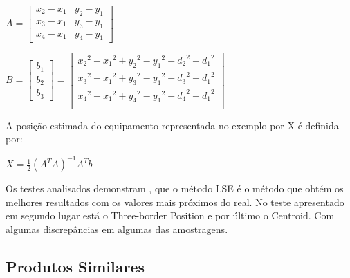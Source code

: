 \begin{center}



$A=\begin{bmatrix}
x_{2}-x_{1} & y_{2}-y_{1}\\
x_{3}-x_{1} & y_{3}-y_{1}\\
x_{4}-x_{1} & y_{4}-y_{1}
\end{bmatrix}$

$B=\begin{bmatrix}
b_{1}\\
b_{2}\\
b_{3}
\end{bmatrix}=\begin{bmatrix}
{x_{2}}^2-{x_{1}}^2  + {y_{2}}^2-{y_{1}}^2 - {d_{2}}^2 + {d_{1}}^2 \\
{x_{3}}^2-{x_{1}}^2  + {y_{3}}^2-{y_{1}}^2 - {d_{3}}^2 + {d_{1}}^2 \\
{x_{4}}^2-{x_{1}}^2  + {y_{4}}^2-{y_{1}}^2 - {d_{4}}^2 + {d_{1}}^2 \\
\end{bmatrix} $

\end{center}

\par A posição estimada do equipamento representada no exemplo por X é definida por:



\par
\begin{center}
$ X= \frac{1}{2}(A^T A)^{-1} A^T b$
\end{center}

\par Os testes analisados demonstram\cite{Wang2013} , que o método LSE é o método que obtém os melhores resultados com os valores mais próximos do real. No teste apresentado em segundo lugar está o Three-border Position e por último o Centroid. Com algumas discrepâncias em algumas das amostragens.

\subsection{Produtos Similares}  \label{produtos}

